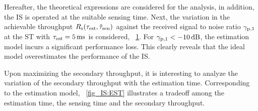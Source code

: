 {\begin{figure}[!ht]
\centering
{}
\caption{}
\label{fig_IS:optT_snr}
\end{figure}

Hereafter, the theoretical expressions are considered for the analysis, in addition, the IS is operated at the suitable sensing time. Next, the variation in the achievable throughput $R_{\text{s}}(\tau_{\text{est}}, \tilde{\tau}_{\text{sen}})$ against the received signal to noise ratio ${\gamma}_{\text{p,1}}$ at the ST with $\tau_{\text{est}} = \SI{5}{ms}$ is considered,  \figurename~\ref{fig_IS:optT_snr}. For ${\gamma}_{\text{p,1}} < -\SI{10}{dB}$, the estimation model incurs a significant performance loss. This clearly reveals that the ideal model overestimates the performance of the IS. 


Upon maximizing the secondary throughput, it is interesting to analyze the variation of the secondary throughput with the estimation time. Corresponding to the estimation model, \figurename~\ref{fig_IS:EST} illustrates a tradeoff among the estimation time, the sensing time and the secondary throughput. }
